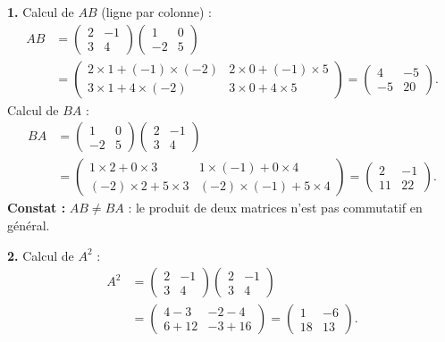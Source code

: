 \documentclass[11pt]{article}
\begin{document}
\begin{corrige}
\textbf{1.} Calcul de $AB$ (ligne par colonne) :
\begin{align*}
AB &= \begin{pmatrix} 2 & -1 \\ 3 & 4 \end{pmatrix}\begin{pmatrix} 1 & 0 \\ -2 & 5 \end{pmatrix} \\
&= \begin{pmatrix} 2\times 1 + (-1)\times(-2) & 2\times 0 + (-1)\times 5 \\ 3\times 1 + 4\times(-2) & 3\times 0 + 4\times 5 \end{pmatrix}
= \begin{pmatrix} 4 & -5 \\ -5 & 20 \end{pmatrix}.
\end{align*}
Calcul de $BA$ :
\begin{align*}
BA &= \begin{pmatrix} 1 & 0 \\ -2 & 5 \end{pmatrix}\begin{pmatrix} 2 & -1 \\ 3 & 4 \end{pmatrix} \\
&= \begin{pmatrix} 1\times 2 + 0\times 3 & 1\times(-1) + 0\times 4 \\ (-2)\times 2 + 5\times 3 & (-2)\times(-1) + 5\times 4 \end{pmatrix}
= \begin{pmatrix} 2 & -1 \\ 11 & 22 \end{pmatrix}.
\end{align*}
\textbf{Constat :} $AB \neq BA$ : le produit de deux matrices n'est pas commutatif en général.

\textbf{2.} Calcul de $A^2$ :
\begin{align*}
A^2 &= \begin{pmatrix} 2 & -1 \\ 3 & 4 \end{pmatrix}\begin{pmatrix} 2 & -1 \\ 3 & 4 \end{pmatrix} \\
&= \begin{pmatrix} 4 - 3 & -2 - 4 \\ 6 + 12 & -3 + 16 \end{pmatrix}
= \begin{pmatrix} 1 & -6 \\ 18 & 13 \end{pmatrix}.
\end{align*}


\end{corrige}
\end{document}
